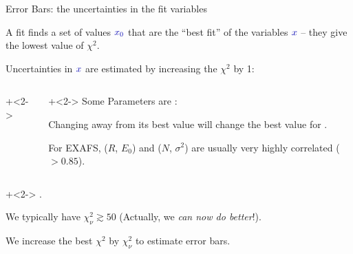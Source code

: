 \begin{slide}{Error Bars: the uncertainties in the fit variables}

\begin{cenpage}{95mm}
A fit finds a set of values $\Blue{x_0}$ that are the ``best fit'' of the variables
$\Blue{x}$ -- they give the lowest value of  $\chi^2$.

\begin{center} Uncertainties in $\Blue{x}$ are estimated by increasing the
  $\chi^2$ by 1: \end{center}

\end{cenpage}

\begin{columns}
\begin{column}{58mm}

\onslide+<2->


\end{column}
\begin{column}{55mm}

{\onslide+<2->
Some Parameters are {}:

\vmm

Changing {} away from its best value will change the best value
for {}.

\vmm

\begin{postitbox}{53mm}
  For EXAFS, ($R$, $E_0$) and ($N$, $\sigma^2$) are usually very highly
  correlated ($>0.85$).
\end{postitbox}
\vmm
}
\end{column}
\end{columns}

 \onslide+<2-> \vmm
 {}.

 \vmm We typically have  $\chi^2_\nu \gtrsim 50$  (Actually, we  {\emph{can
     now do better}}!).

\vmm
We increase the best $\chi^2$ by $\chi^2_\nu$ to estimate error bars.


\vmm \vmm

\end{slide}



